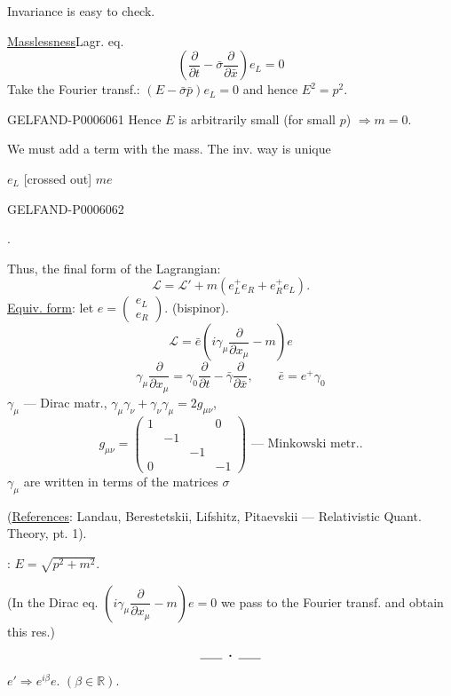 Invariance is easy to check.

\underline{Masslessness}\qquad Lagr. eq.
\[
\left(\frac{\partial}{\partial t}-\bar\sigma\frac{\partial}{\partial\bar x}\right)e_L=0
\]
Take the Fourier transf.: \((E-\bar\sigma\bar p)e_L=0\) and hence \(E^2=p^2\).


\begin{GelfandAdjacentEvidence}{GELFAND-P000606}{1}
Hence \(E\) is arbitrarily small (for small \(p\)) \(\Rightarrow m=0\).

We must add a term with the mass. The inv. way is unique

\sout{\(e_L\)} [crossed out] \sout{\(me\)}
\end{GelfandAdjacentEvidence}
\begin{GelfandAdjacentEvidence}{GELFAND-P000606}{2}

\begin{center}
.
\end{center}
Thus, the final form of the Lagrangian:
\[
\mathcal L=\mathcal L'+m(e_L^+e_R+e_R^+e_L).
\]
\underline{\underline{Equiv. form}}: let \(e=\begin{pmatrix}e_L\\e_R\end{pmatrix}\). (bispinor).
\[
\mathcal L=\bar e\left(i\gamma_\mu\frac{\partial}{\partial x_\mu}-m\right)e
\]
\[
\gamma_\mu\frac{\partial}{\partial x_\mu}
=\gamma_0\frac{\partial}{\partial t}-\bar\gamma\frac{\partial}{\partial\bar x},
\qquad \bar e=e^+\gamma_0
\]
\(\gamma_\mu\) — Dirac matr.,
\(\gamma_\mu\gamma_\nu+\gamma_\nu\gamma_\mu=2g_{\mu\nu}\),
\[
g_{\mu\nu}=\begin{pmatrix}
1&&&0\\
&-1&&\\
&&-1&\\
0&&&-1
\end{pmatrix}\text{ — Minkowski metr..}
\]
\(\gamma_\mu\) are written in terms of the matrices \(\sigma\)

(\underline{References}: Landau, Berestetskii, Lifshitz, Pitaevskii — Relativistic Quant. Theory, pt. 1).

: \(E=\sqrt{p^2+m^2}\).

(In the Dirac eq. \(\left(i\gamma_\mu\dfrac{\partial}{\partial x_\mu}-m\right)e=0\)
we pass to the Fourier transf. and obtain this res.)
\[
\rule{1.8em}{.4pt}\;\boldsymbol{\cdot}\;\rule{1.8em}{.4pt}
\]
\qquad \(e'\Rightarrow e^{i\beta}e\). \((\beta\in\mathbb R)\).
\end{GelfandAdjacentEvidence}
